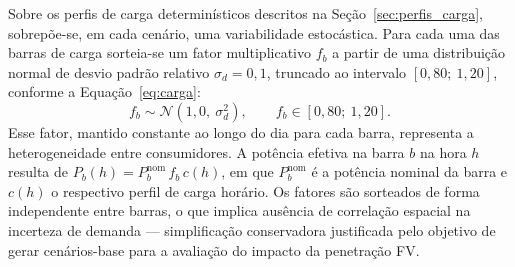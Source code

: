 Sobre os perfis de carga determinísticos descritos na Seção~\ref{sec:perfis_carga}, sobrepõe-se, em cada cenário, uma variabilidade estocástica. Para cada uma das barras de carga sorteia-se um fator multiplicativo $f_b$ a partir de uma distribuição normal de desvio padrão relativo $\sigma_d = 0{,}1$, truncado ao intervalo $[0{,}80;\ 1{,}20]$, conforme a Equação~\eqref{eq:carga}:
\begin{equation}
  f_b \sim \mathcal{N}(1{,}0,\ \sigma_d^2), \qquad f_b \in [0{,}80;\ 1{,}20].
  \label{eq:carga}
\end{equation}
Esse fator, mantido constante ao longo do dia para cada barra, representa a heterogeneidade entre consumidores. A potência efetiva na barra $b$ na hora $h$ resulta de $P_b(h) = P_b^\text{nom}\, f_b\, c(h)$, em que $P_b^\text{nom}$ é a potência nominal da barra e $c(h)$ o respectivo perfil de carga horário. Os fatores são sorteados de forma independente entre barras, o que implica ausência de correlação espacial na incerteza de demanda --- simplificação conservadora justificada pelo objetivo de gerar cenários-base para a avaliação do impacto da penetração FV.
